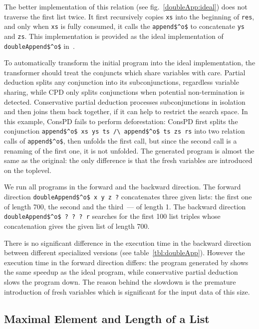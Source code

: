 The better implementation of this relation (see fig.~\ref{doubleApp:ideal}) does not traverse the first list twice.
It first recursively copies \lstinline{xs} into the beginning of \lstinline{res}, and only when \lstinline{xs} is fully consumed, it calls the \lstinline{append$^o$} to concatenate \lstinline{ys} and \lstinline{zs}.
This implementation is provided as the ideal implementation of \lstinline{doubleAppend$^o$} in~\cite{de1999conjunctive}.

To automatically transform the initial program into the ideal implementation, the transformer should treat the conjuncts which share variables with care.
Partial deduction splits any conjunction into its subconjunctions, regardless variable sharing, while CPD only splits conjunctions when potential non-termination is detected.
Conservative partial deduction processes subconjunctions in isolation and then joins them back together, if it can help to restrict the search space.
In this example, ConsPD fails to perform deforestation: ConsPD first splits the conjunction \lstinline{append$^o$ xs ys ts /\ append$^o$ ts zs rs} into two relation calls of \lstinline{append$^o$}, then unfolds the first call, but since the second call is a renaming of the first one, it is not unfolded.
The generated program is almost the same as the original: the only difference is that the fresh variables are introduced on the toplevel.


We run all programs in the forward and the backward direction.
The forward direction \lstinline{doubleAppend$^o$ x y z ?} concatenates three given lists: the first one of length 700, the second and the third~--- of length 1.
The backward direction \lstinline{doubleAppend$^o$ ? ? ? r} searches for the first 100 list triples whose concatenation gives the given list of length 700.

There is no significant difference in the execution time in the backward direction between different specialized versions (see table~\ref{tbl:doubleApp}).
However the execution time in the forward direction differs: the program generated by \ecce shows the same speedup as the ideal program, while conservative partial deduction slows the program down.
The reason behind the slowdown is the premature introduction of fresh variables which is significant for the input data of this size.

\subsection{Maximal Element and Length of a List}

